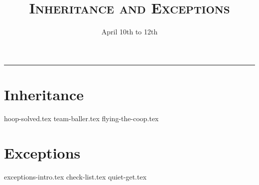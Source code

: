 \documentclass{exam}
\title{\textsc{Inheritance and Exceptions}}
\date{April 10th to 12th}
\begin{document}
\maketitle
\rule{\textwidth}{0.15em}
\fontsize{12}{15}\selectfont


\begin{questions}
\section{Inheritance}
{hoop-solved.tex}
{team-baller.tex}
{flying-the-coop.tex}
\newpage
\section{Exceptions}
{exceptions-intro.tex}
\newpage
{check-list.tex}
{quiet-get.tex}


\end{questions}
\end{document}
